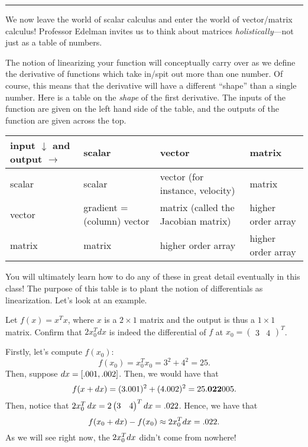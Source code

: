 \vspace{.15cm}
\hrule
\vspace{.15cm}

We now leave the world of scalar calculus and enter the world of vector/matrix calculus! Professor Edelman invites us to think about matrices \textit{holistically}---not just as a table of numbers.

The notion of linearizing your function will conceptually carry over as we define the derivative of  functions which take in/spit out more 
than one number.
Of course, this means that the derivative will have a different ``shape'' than a single number. Here is a table on the \textit{shape} of the first derivative. The inputs of the function are given on the left hand side of the table, and the outputs of the function are given across the top. 

\begin{table}[h]
\centering
\begin{tabular}{l|l|l|l|}
\cline{2-4}
                                            
         input $\downarrow$  and output $\rightarrow$   & scalar & vector & matrix \\ \hline
\multicolumn{1}{|l|}{scalar} & scalar & vector (for instance, velocity) & matrix \\ \hline
\multicolumn{1}{|l|}{vector}  & gradient = (column) vector & matrix (called the Jacobian matrix) & higher order array  
\\ \hline
\multicolumn{1}{|l|}{matrix}   & matrix & higher order array & higher order array  \\ \hline
\end{tabular}
\end{table}

You will ultimately learn how to do any of these in great detail eventually in this class! The purpose of this table is to plant the notion of differentials as linearization. Let's look at an example.

\begin{example}
Let $f(x) = x^T x$, where $x$ is a $2\times 1$ matrix and the output is thus a $1\times 1$ matrix.
Confirm that $2x_0^T dx$
is indeed the differential of $f$ at $x_0 = \begin{pmatrix}  3 & 4\end{pmatrix}^T$.
\end{example}

Firstly, let's compute $f(x_0)$:
\[
f(x_0) = x_0^T x_0 = 3^2 + 4^2 = 25.
\]
Then, suppose $d x = [.001,.002]$. Then, we would have that 
\[
f(x+d x) = (3.001)^2 + (4.002)^2 = 25.\mathbf{022}005.
\]
Then, notice that $2x_0^T \,d x = 2\begin{pmatrix}
    3  & 4 
\end{pmatrix}^T d x = .022$. Hence, we have that 
\[
f(x_0 + d x) - f(x_0) \approx 2x_0^{T} d x = .022.
\]
As we will see right now, the $2x_0^Td x$ didn't come from nowhere!

